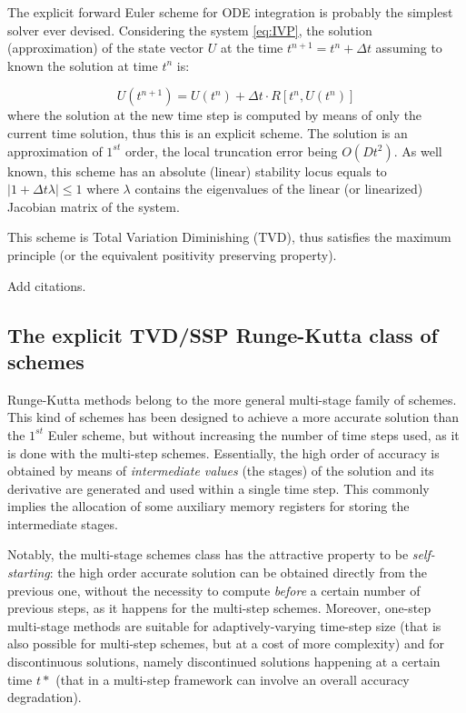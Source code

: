 \documentclass[pdftex,preprint,3p,times,numbers]{elsarticle}
\begin{document}
The explicit forward Euler scheme for ODE integration is probably the simplest solver ever devised. Considering the system \ref{eq:IVP}, the solution (approximation) of the state vector $U$ at the time $t^{n+1}=t^n+\Delta t$ assuming to known the solution at time $t^n$ is:

\begin{equation}
  U\left(t^{n+1}\right) = U\left(t^n\right) +\Delta t \cdot R\left[t^n, U\left(t^n\right)\right]
\label{eq:solver-euler}
\end{equation}
where the solution at the new time step is computed by means of only the current time solution, thus this is an explicit scheme. The solution is an approximation of $1^{st}$ order, the local truncation error being $O(Dt^2)$. As well known, this scheme has an absolute (linear) stability locus equals to $|1+\Delta t \lambda|\le 1$ where $\lambda$ contains the eigenvalues of the linear (or linearized) Jacobian matrix of the system.

This scheme is Total Variation Diminishing (TVD), thus satisfies the maximum principle (or the equivalent positivity preserving property).

{\color{red} Add citations.}

\subsection{The explicit TVD/SSP Runge-Kutta class of schemes}

Runge-Kutta methods belong to the more general multi-stage family of schemes. This kind of schemes has been designed to achieve a more accurate solution than the $1^{st}$ Euler scheme, but without increasing the number of time steps used, as it is done with the multi-step schemes. Essentially, the high order of accuracy is obtained by means of \emph{intermediate values} (the stages) of the solution and its derivative are generated and used within a single time step. This commonly implies the allocation of some auxiliary memory registers for storing the intermediate stages.

Notably, the multi-stage schemes class has the attractive property to be \emph{self-starting}: the high order accurate solution can be obtained directly from the previous one, without the necessity to compute \emph{before} a certain number of previous steps, as it happens for the multi-step schemes. Moreover, one-step multi-stage methods are suitable for adaptively-varying time-step size (that is also possible for multi-step schemes, but at a cost of more complexity) and for discontinuous solutions, namely discontinued solutions happening at a certain time $t*$ (that in a multi-step framework can involve an overall accuracy degradation).
\end{document}
